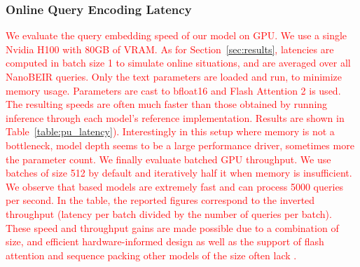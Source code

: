\subsubsection{Online Query Encoding Latency}
\label{appendix:gpu_latency}
\textcolor{red}{We evaluate the query embedding speed of our model on GPU. We use a single Nvidia H100 with 80GB of VRAM. As for Section~\ref{sec:results}, latencies are computed in batch size 1 to simulate online situations, and are averaged over all NanoBEIR queries. Only the text parameters are loaded and run, to minimize memory usage. Parameters are cast to bfloat16 and Flash Attention 2 is used. The resulting speeds are often much faster than those obtained by running inference through each model's reference implementation. Results are shown in Table~\ref{table:pu_latency}). Interestingly in this setup where memory is not a bottleneck, model depth seems to be a large performance driver, sometimes more the parameter count.
We finally evaluate batched GPU throughput. We use batches of size 512 by default and iteratively half it when memory is insufficient. We observe that \flagship{} based models are extremely fast and can process 5000 queries per second. In the table, the reported figures correspond to the inverted throughput (latency per batch divided by the number of queries per batch). These speed and throughput gains are made possible due to a combination of size, and efficient hardware-informed design as well as the support of flash attention and sequence packing other models of the size often lack \citep{warner2024smarterbetterfasterlonger}.
}






\clearpage

